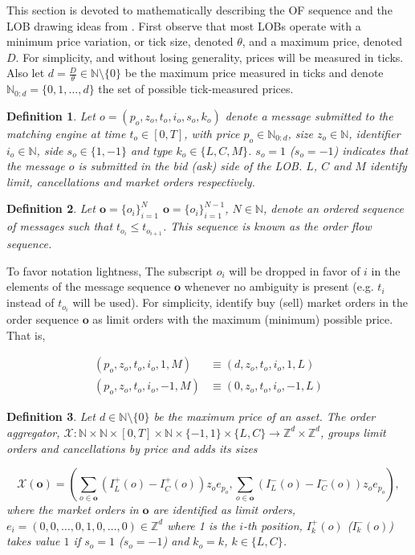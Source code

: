\documentclass[10pt,a4paper,oneside]{article}
\newcommand{\N}{\mathbb{N}}
\newcommand{\Z}{\mathbb{Z}}
\newtheorem{definition}{Definition}
\providecommand{\DIFaddtex}[1]{{\protect\color{blue} \sf #1}} %
\providecommand{\DIFdeltex}[1]{{\protect\color{red} \scriptsize #1}} %
\providecommand{\DIFaddbegin}{} %
\providecommand{\DIFaddend}{} %
\providecommand{\DIFdelbegin}{} %
\providecommand{\DIFdelend}{} %
\providecommand{\DIFadd}[1]{\texorpdfstring{\DIFaddtex{#1}}{#1}} %
\providecommand{\DIFdel}[1]{\texorpdfstring{\DIFdeltex{#1}}{}} %
\newcommand{\DIFscaledelfig}{0.5}
\newlength{\DIFdelgraphicswidth} %
\newlength{\DIFdelgraphicsheight} %
\newcommand{\DIFaddincludegraphics}[2][]{{\color{blue}\fbox{\DIFOincludegraphics[#1]{#2}}}} %
\newcommand{\DIFdelincludegraphics}[2][]{%
\sbox{\DIFdelgraphicsbox}{\DIFOincludegraphics[#1]{#2}}%
\settoboxwidth{\DIFdelgraphicswidth}{\DIFdelgraphicsbox} %
\settoboxtotalheight{\DIFdelgraphicsheight}{\DIFdelgraphicsbox} %
\scalebox{\DIFscaledelfig}{%
\parbox[b]{\DIFdelgraphicswidth}{\usebox{\DIFdelgraphicsbox}\\[-\baselineskip] \rule{\DIFdelgraphicswidth}{0em}}\llap{\resizebox{\DIFdelgraphicswidth}{\DIFdelgraphicsheight}{%
\setlength{\unitlength}{\DIFdelgraphicswidth}%
\begin{picture}(1,1)%
\thicklines\linethickness{2pt} %
{\color[rgb]{1,0,0}\put(0,0){\framebox(1,1){}}}%
{\color[rgb]{1,0,0}\put(0,0){\line( 1,1){1}}}%
{\color[rgb]{1,0,0}\put(0,1){\line(1,-1){1}}}%
\end{picture}%
}\hspace*{3pt}}} %
} %
\DeclareRobustCommand{\DIFaddbegin}{\DIFOaddbegin \let\includegraphics\DIFaddincludegraphics} %
\DeclareRobustCommand{\DIFaddend}{\DIFOaddend \let\includegraphics\DIFOincludegraphics} %
\DeclareRobustCommand{\DIFdelbegin}{\DIFOdelbegin \let\includegraphics\DIFdelincludegraphics} %
\DeclareRobustCommand{\DIFdelend}{\DIFOaddend \let\includegraphics\DIFOincludegraphics} %
\begin{document}
This section is devoted to mathematically describing the OF sequence and the LOB drawing ideas from \cite{cont2023mathematical, gould2013limit, panayi2015stochastic}. First observe that most LOBs operate with a minimum price variation, or tick size, denoted $\theta$, and a maximum price, denoted $D$. For simplicity, and without losing generality, prices will be measured in ticks. Also let $d = \frac{D}{\theta} \in \N \setminus \{ 0 \}$ be the maximum price measured in ticks and denote $\N_{0:d} = \{ 0, 1, \dots, d\}$ the set of possible tick-measured prices.

\begin{definition}
    Let $o = (p_o, z_o, t_o, i_o, s_o, k_o)$ denote a message submitted to the matching engine at time $t_o \in [0, T]$, with price $p_o \in \N_{0:d}$, size $z_o \in \N$, identifier $i_o \in \N$, side $s_o \in \{1, -1\}$ and type $k_o \in \{L, C, M \}$. $s_o = 1$ ($s_o = -1$) indicates that the message $o$ is submitted in the bid (ask) side of the LOB. $L$, $C$ and $M$ identify limit, cancellations and market orders respectively. 
    \label{def:order}
\end{definition}

\begin{definition}
    Let \DIFdelbegin \DIFdel{$\mathbf{o} = \{o_i\}^N_{i = 1} $}\DIFdelend \DIFaddbegin \DIFadd{$\mathbf{o} = \{o_i\}^{N - 1}_{i = 1} $}\DIFaddend , $N \in \N$, denote an ordered sequence of messages such that $t_{o_i} \leq t_{o_{i + 1}}$. This sequence is known as the order flow sequence.
\label{def:order_seq}
\end{definition}

To favor notation lightness, The subscript $o_i$ will be dropped in favor of $i$ in the elements of the message sequence $\mathbf{o}$ whenever no ambiguity is present (e.g. $t_i$ instead of $t_{o_i}$ will be used). For simplicity, identify buy (sell) market orders in the order sequence $\mathbf{o}$ as limit orders with the maximum (minimum) possible price. That is, 

\begin{align*}
    (p_o, z_o, t_o, i_o, 1,  M) &\equiv (d, z_o, t_o, i_o, 1, L) \\
    (p_o, z_o, t_o, i_o, -1, M) &\equiv (0, z_o, t_o, i_o, -1, L)
\end{align*}


\begin{definition}
Let $d \in \N \setminus \{ 0 \}$ be the maximum price of an asset. The order aggregator, $\mathcal{X} : \N \times \N \times [0, T] \times \N \times \{-1, 1 \} \times \{ L, C\} \rightarrow \Z^d \times \Z^d$, groups limit orders and cancellations by price and adds its sizes

$$
\mathcal{X}(\mathbf{o}) = \left( \sum_{o \in \mathbf{o}} (I^+_L(o) - I^+_C(o)) z_o e_{p_o}, \sum_{o \in \mathbf{o}} (I^-_L(o) - I^-_C(o)) z_o e_{p_o} \right),
$$
where the market orders in $\mathbf{o}$ are identified as limit orders, $e_i = (0, 0, \dots, 0, 1, 0, \dots, 0) \in \Z^d$ where 1 is the $i$-th position, $I^+_k(o)$ ($I^-_k(o)$) takes value $1$ if $s_o = 1$ ($s_o = -1$) and $k_o = k$, $k \in \{ L, C\}$.
\label{def:order_aggregator}
\end{definition}
\end{document}
